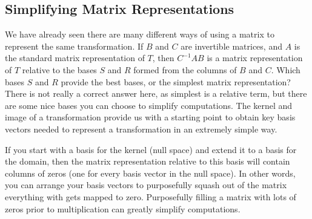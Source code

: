 \subsection{Simplifying Matrix Representations}


We have already seen there are many different ways of using a matrix to represent the same transformation. 
If $B$ and $C$ are invertible matrices, and $A$ is the standard matrix representation of $T$, then $C^{-1} A B$ is a matrix representation of $T$ relative to the bases $S$ and $R$ formed from the columns of $B$ and $C$.  
Which bases $S$ and $R$ provide the best bases, or the simplest matrix representation? 
There is not really a correct answer here, as simplest is a relative term, but there are some nice bases you can choose to simplify computations.  
The kernel and image of a transformation provide us with a starting point to obtain key basis vectors needed to represent a transformation in an extremely simple way.


If you start with a basis for the kernel (null space) and extend it to a basis for the domain, then the matrix representation relative to this basis will contain columns of zeros (one for every basis vector in the null space). In other words, you can arrange your basis vectors to purposefully squash out of the matrix everything with gets mapped to zero.  Purposefully filling a matrix with lots of zeros prior to multiplication can greatly simplify computations.

